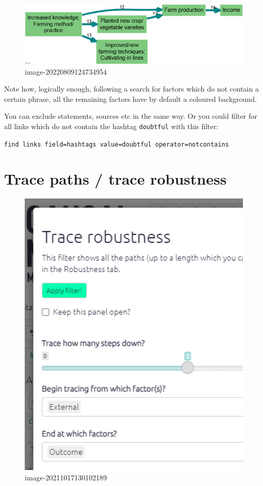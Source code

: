 \documentclass[
]{book}
\begin{document}
\begin{figure}
\centering
\includegraphics[width=6.77083in,height=\textheight]{_assets/image-20220809124734954.png}
\caption{image-20220809124734954}
\end{figure}

Note how, logically enough, following a search for factors which do not contain a certain phrase, all the remaining factors have by default a coloured background.

You can exclude statements, sources etc in the same way. Or you could filter for all links which do not contain the hashtag \texttt{doubtful} with this filter:

\texttt{find\ links\ field=hashtags\ value=doubtful\ operator=notcontains}

\hypertarget{trace-paths-trace-robustness}{%
\section{Trace paths / trace robustness}\label{trace-paths-trace-robustness}}

\begin{figure}
\centering
\includegraphics[width=6.77083in,height=\textheight]{_assets/image-20211017130102189.png}
\caption{image-20211017130102189}
\end{figure}
\end{document}
